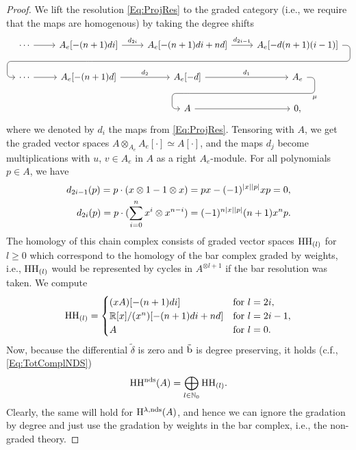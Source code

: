 \documentclass[\MainFolder/Text.tex]{subfiles}
\begin{document}
\begin{proof}
We lift the resolution \eqref{Eq:ProjRes} to the graded category (i.e., we require that the maps are homogenous) by taking the degree shifts
\[
\begin{tikzcd}
\dotsb \arrow{r} &
A_e[-(n+1)di] \arrow{r}{d_{2i}} \ar[draw=none]{d}[name=X, anchor=center]{}& 
A_e[-(n+1)di + nd] \arrow{r}{d_{2i-1}} &
A_e[-d(n+1)(i-1)]  \ar[rounded corners,
            to path={ -- ([xshift=2ex]\tikztostart.east)
                      |- (X.center) \tikztonodes
                      -| ([xshift=-2ex]\tikztotarget.west)
                      -- (\tikztotarget)}]{dlll}[at end]{}\\
\dotsb\arrow{r} &
A_e[-(n+1)d] \arrow{r}{d_{2}} &
A_e[-d] \arrow{r}{d_1}\ar[draw=none]{d}[name=Y, anchor=center]{} &
A_e  \ar[rounded corners,
            to path={ -- ([xshift=2ex]\tikztostart.east)
                      |- (Y.center) \tikztonodes
                      -| ([xshift=-2ex]\tikztotarget.west)
                      -- (\tikztotarget)}]{dl}{\mu} \\ 
&  & A \arrow{r} & 0,
\end{tikzcd}
\]
where we denoted by $d_i$ the maps from \eqref{Eq:ProjRes}.
Tensoring with $A$, we get the graded vector spaces $A \otimes_{A_e} A_e[\cdot] \simeq A[\cdot]$, and the maps $d_j$ become multiplications with $u$, $v \in A_e$ in $A$ as a right $A_e$-module.
For all polynomials $p\in A$, we have
$$ \begin{aligned}
    d_{2i-1}(p) = p\cdot (x\otimes 1 - 1 \otimes x) &= px - (-1)^{|x| |p|}xp = 0, \\
    d_{2i}(p) = p\cdot (\sum_{i=0}^n x^i \otimes x^{n-i}) & = (-1)^{n |x||p|}(n+1) x^n p.
\end{aligned}$$
The homology of this chain complex consists of graded vector spaces $\mathrm{H}\mathrm{H}_{(l)}$ for $l\ge 0$ which correspond to the homology of the bar complex graded by weights, i.e., $\mathrm{H}\mathrm{H}_{(l)}$ would be represented by cycles in $A^{\otimes l+1}$ if the bar resolution was taken. We compute
\begin{equation}\label{Eq:HochCPn}
\mathrm{H}\mathrm{H}_{(l)} = \begin{cases} 
 (x A)[-(n+1)di] & \text{for }l=2i, \\
 \mathbb{R}[x]/(x^n)[-(n+1)di + nd] & \text{for }l = 2i - 1, \\
 A & \text{for }l = 0.
\end{cases}
\end{equation}
Now, because the differential $\tilde{\delta}$ is zero and $\tilde{\mathrm{b}}$ is degree preserving, it holds (c.f., \eqref{Eq:TotComplNDS})
\[\mathrm{H}\mathrm{H}^{\mathrm{nds}}(A) = \bigoplus_{l\in \mathbb{N}_0} \mathrm{H}\mathrm{H}_{(l)}.\] 
Clearly, the same will hold for $\mathrm{H}^{\lambda,\mathrm{nds}}(A)$, and hence we can ignore the gradation by degree and just use the gradation by weights in the bar complex, i.e., the non-graded theory.


\end{proof}
\end{document}
